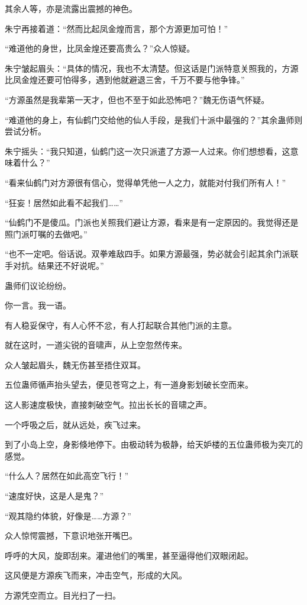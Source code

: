 \begin{this_body}
其余人等，亦是流露出震撼的神色。

朱宁再接着道：“然而比起凤金煌而言，那个方源更加可怕！”

“难道他的身世，比凤金煌还要高贵么？”众人惊疑。

朱宁皱起眉头：“具体的情况，我也不太清楚。但这话是门派特意关照我的，方源比凤金煌还要可怕得多，遇到他就避退三舍，千万不要与他争锋。”

“方源虽然是我辈第一天才，但也不至于如此恐怖吧？”魏无伤语气怀疑。

“难道他的身上，有仙鹤门交给他的仙人手段，是我们十派中最强的？”其余蛊师则尝试分析。

朱宁摇头：“我只知道，仙鹤门这一次只派遣了方源一人过来。你们想想看，这意味着什么？”

“看来仙鹤门对方源很有信心，觉得单凭他一人之力，就能对付我们所有人！”

“狂妄！居然如此看不起我们……”

“仙鹤门不是傻瓜。门派也关照我们避让方源，看来是有一定原因的。我觉得还是照门派叮嘱的去做吧。”

“也不一定吧。俗话说。双拳难敌四手。如果方源最强，势必就会引起其余门派联手对抗。结果还不好说呢。”

蛊师们议论纷纷。

你一言。我一语。

有人稳妥保守，有人心怀不忿，有人打起联合其他门派的主意。

就在这时，一道尖锐的音啸声，从上空忽然传来。

众人皱起眉头，魏无伤甚至捂住双耳。

五位蛊师循声抬头望去，便见苍穹之上，有一道身影划破长空而来。

这人影速度极快，直接刺破空气。拉出长长的音啸之声。

一个呼吸之后，就从远处，疾飞过来。

到了小岛上空，身影倏地停下。由极动转为极静，给天妒楼的五位蛊师极为突兀的感觉。

“什么人？居然在如此高空飞行！”

“速度好快，这是人是鬼？”

“观其隐约体貌，好像是……方源？”

众人惊愕震撼，下意识地张开嘴巴。

呼呼的大风，旋即刮来。灌进他们的嘴里，甚至逼得他们双眼闭起。

这风便是方源疾飞而来，冲击空气，形成的大风。

方源凭空而立。目光扫了一扫。


\end{this_body}
